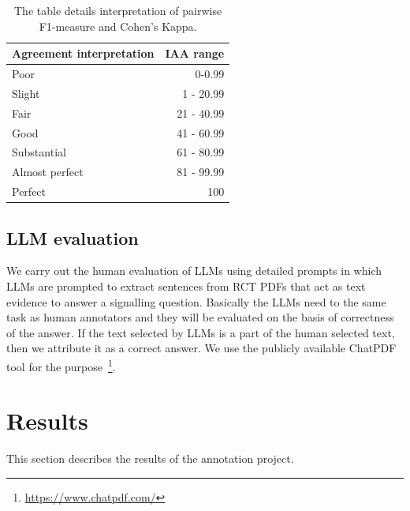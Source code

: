 \documentclass[sn-mathphys,Numbered]{sn-jnl}%
\theoremstyle{thmstyleone}%
\theoremstyle{thmstyletwo}%
\theoremstyle{thmstylethree}%
\begin{document}
%
%
%
\begin{center}
 \begin{table}[ht]
   \caption{The table details interpretation of pairwise F1-measure and Cohen's Kappa.}\label{tab:iaa_interpret}
 \centering
    \begin{tabular}{|l|r|}
    \hline
    Agreement interpretation & IAA range \\ 
    \hline
    \hline
        Poor & 0-0.99 \\ 
        Slight & 1 - 20.99 \\ 
        Fair & 21 - 40.99 \\ 
        Good & 41 - 60.99 \\ 
        Substantial & 61 - 80.99 \\ 
        Almost perfect & 81 - 99.99 \\ 
        Perfect & 100 \\ 
    \hline
    \end{tabular}
 \end{table}   
\end{center}
%
%
%
%
%
%
\subsection{LLM evaluation}
\label{llms}
%
We carry out the human evaluation of LLMs using detailed prompts in which LLMs are prompted to extract sentences from RCT PDFs that act as text evidence to answer a signalling question.
Basically the LLMs need to the same task as human annotators and they will be evaluated on the basis of correctness of the answer.
If the text selected by LLMs is a part of the human selected text, then we attribute it as a correct answer.
We use the publicly available ChatPDF tool for the purpose~\footnote{\url{https://www.chatpdf.com/}}.
%
%
%
\section{Results}
\label{sec:results}
%
This section describes the results of the annotation project.
\end{document}
